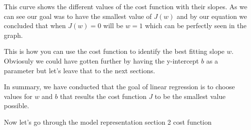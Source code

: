 This curve shows the different values of the cost function with their slopes. 
As we can see our goal was to have the smallest value of $J(w)$ and by our equation we concluded that when $J(w)=0$ will be $w=1$ which can be perfectly seen in the graph. 

This is how you can use the cost function to identify the best fitting slope $w$. 
Obviosuly we could have gotten further by having the y-intercept $b$ as a parameter but let's leave that to the next sections. 

In summary, we have conducted that the goal of linear regression is to choose values for $w$ and $b$ that results the cost function $J$ to be the smallest value possible. 

Now let's go through the model representation section 2 cost function